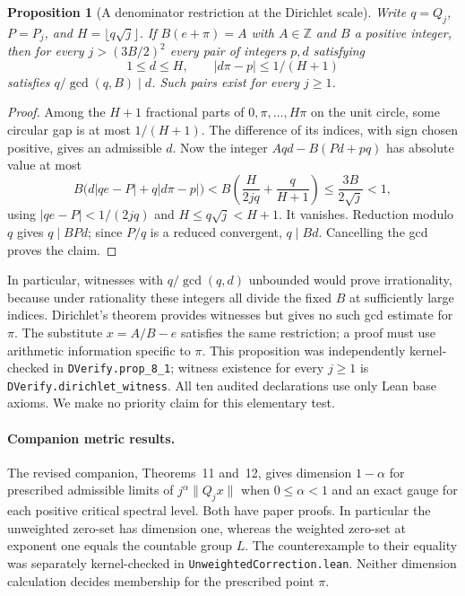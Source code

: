 \documentclass[11pt]{amsart}
\newtheorem{proposition}[theorem]{Proposition}
\theoremstyle{definition}
\theoremstyle{remark}
\numberwithin{equation}{section}
\newcommand{\Z}{\mathbb{Z}}
\begin{document}
\begin{proposition}[A denominator restriction at the Dirichlet scale]
\label{prop:dirichlet-divisor}
Write $q=Q_j$, $P=P_j$, and $H=\lfloor q\sqrt j\rfloor$.
If $B(e+\pi)=A$ with $A\in\Z$ and $B$ a positive integer,
then for every $j>(3B/2)^2$ every pair of integers $p,d$ satisfying
\[
 1\le d\le H,\qquad |d\pi-p|\le 1/(H+1)
\]
satisfies $q/\gcd(q,B)\mid d$. Such pairs exist for every $j\ge1$.
\end{proposition}
\begin{proof}
Among the $H+1$ fractional parts of $0,\pi,\ldots,H\pi$ on the
unit circle, some circular gap is at most $1/(H+1)$. The difference
of its indices, with sign chosen positive, gives an admissible $d$.
Now the integer $Aqd-B(Pd+pq)$ has absolute value at most
\[
 B\bigl(d|qe-P|+q|d\pi-p|\bigr)
 < B\left(\frac{H}{2jq}+\frac{q}{H+1}\right)
 \le \frac{3B}{2\sqrt j}<1,
\]
using $|qe-P|<1/(2jq)$ and $H\le q\sqrt j<H+1$.
It vanishes. Reduction modulo $q$ gives $q\mid BPd$; since $P/q$
is a reduced convergent, $q\mid Bd$. Cancelling the gcd proves the claim.
\end{proof}
In particular, witnesses with $q/\gcd(q,d)$ unbounded would prove
irrationality, because under rationality these integers all divide
the fixed $B$ at sufficiently large indices. Dirichlet's theorem
provides witnesses but gives no such gcd estimate for $\pi$.
The substitute $x=A/B-e$ satisfies the same restriction; a proof
must use arithmetic information specific to $\pi$. This proposition was independently kernel-checked in \texttt{DVerify.prop\_8\_1}; witness existence for every $j\ge1$ is \texttt{DVerify.dirichlet\_witness}. All ten audited declarations use only Lean base axioms. We make no priority claim for this elementary test.

\paragraph{Companion metric results.} The revised companion, Theorems~11
and~12, gives dimension $1-\alpha$ for prescribed admissible limits
of $j^\alpha\|Q_jx\|$ when $0\le\alpha<1$ and an exact gauge for each
positive critical spectral level. Both have paper proofs. In particular
the unweighted zero-set has dimension one, whereas the weighted
zero-set at exponent one equals the countable group $L$. The
counterexample to their equality was separately kernel-checked in
\texttt{UnweightedCorrection.lean}. Neither dimension calculation
decides membership for the prescribed point $\pi$.
\end{document}
